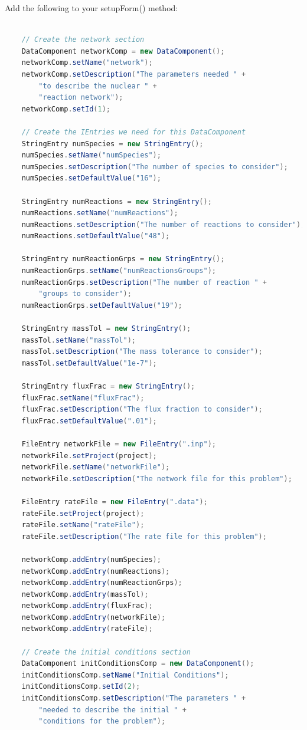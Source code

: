 Add the following to your setupForm() method: 

\begin{lstlisting}[language=Java]

    // Create the network section
    DataComponent networkComp = new DataComponent();
    networkComp.setName("network");
    networkComp.setDescription("The parameters needed " +
        "to describe the nuclear " +
    	"reaction network"); 
    networkComp.setId(1);
    
    // Create the IEntries we need for this DataComponent
    StringEntry numSpecies = new StringEntry();
    numSpecies.setName("numSpecies");
    numSpecies.setDescription("The number of species to consider");
    numSpecies.setDefaultValue("16");
    
    StringEntry numReactions = new StringEntry();
    numReactions.setName("numReactions");
    numReactions.setDescription("The number of reactions to consider");
    numReactions.setDefaultValue("48");
    
    StringEntry numReactionGrps = new StringEntry();
    numReactionGrps.setName("numReactionsGroups");
    numReactionGrps.setDescription("The number of reaction " + 
    	"groups to consider"); 
    numReactionGrps.setDefaultValue("19");

    StringEntry massTol = new StringEntry();
    massTol.setName("massTol");
    massTol.setDescription("The mass tolerance to consider");
    massTol.setDefaultValue("1e-7");
    
    StringEntry fluxFrac = new StringEntry();
    fluxFrac.setName("fluxFrac");
    fluxFrac.setDescription("The flux fraction to consider");
    fluxFrac.setDefaultValue(".01");
    
    FileEntry networkFile = new FileEntry(".inp");
    networkFile.setProject(project);
    networkFile.setName("networkFile");
    networkFile.setDescription("The network file for this problem");
    
    FileEntry rateFile = new FileEntry(".data");
    rateFile.setProject(project);
    rateFile.setName("rateFile");
    rateFile.setDescription("The rate file for this problem");
    
    networkComp.addEntry(numSpecies);
    networkComp.addEntry(numReactions);
    networkComp.addEntry(numReactionGrps); 
    networkComp.addEntry(massTol);
    networkComp.addEntry(fluxFrac);
    networkComp.addEntry(networkFile);
    networkComp.addEntry(rateFile);
    
    // Create the initial conditions section
    DataComponent initConditionsComp = new DataComponent();
    initConditionsComp.setName("Initial Conditions");
    initConditionsComp.setId(2);
    initConditionsComp.setDescription("The parameters " +
    	"needed to describe the	initial " + 
    	"conditions for the problem");
    

\end{lstlisting}
